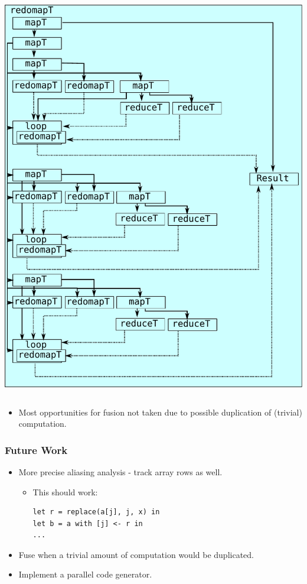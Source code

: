 \documentclass{beamer}
\begin{document}
\begin{frame}
\begin{columns}
\begin{column}{0.4\textwidth}
  \includegraphics[width=\textwidth]{img/CalibLexiFi-fused.pdf}
\end{column}
\end{columns}

\begin{itemize}
\item Most opportunities for fusion not taken due to possible
  duplication of (trivial) computation.
\end{itemize}

\end{frame}

\begin{frame}[fragile]
  \frametitle{Future Work}

  \begin{itemize}
  \item More precise aliasing analysis - track array rows as well.
    \begin{itemize}
    \item This should work:
\begin{lstlisting}
let r = replace(a[j], j, x) in
let b = a with [j] <- r in
...
\end{lstlisting}
    \end{itemize}

  \item Fuse when a trivial amount of computation would be duplicated.
  \item Implement a parallel code generator.
  \end{itemize}
\end{frame}
\end{document}
